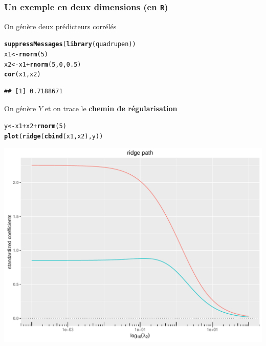 \documentclass{beamer}\usepackage[]{graphicx}\usepackage[]{color}
\makeatletter
\newcommand{\hlnum}[1]{\textcolor[rgb]{0.686,0.059,0.569}{#1}}%
\newcommand{\hlopt}[1]{\textcolor[rgb]{0,0,0}{#1}}%
\newcommand{\hlstd}[1]{\textcolor[rgb]{0.345,0.345,0.345}{#1}}%
\newcommand{\hlkwb}[1]{\textcolor[rgb]{0.69,0.353,0.396}{#1}}%
\newcommand{\hlkwd}[1]{\textcolor[rgb]{0.737,0.353,0.396}{\textbf{#1}}}%
\newenvironment{kframe}{%
 \def\at@end@of@kframe{}%
 \ifinner\ifhmode%
  \def\at@end@of@kframe{\end{minipage}}%
  \begin{minipage}{\columnwidth}%
 \fi\fi%
 \def\FrameCommand##1{\hskip\@totalleftmargin \hskip-\fboxsep
 \colorbox{shadecolor}{##1}\hskip-\fboxsep
     \hskip-\linewidth \hskip-\@totalleftmargin \hskip\columnwidth}%
 \MakeFramed {\advance\hsize-\width
   \@totalleftmargin\z@ \linewidth\hsize
   \@setminipage}}%
 {\par\unskip\endMakeFramed%
 \at@end@of@kframe}
\newenvironment{knitrout}{}{} %
\makeatother
\begin{document}
\begin{frame}
  \frametitle{Un exemple en deux dimensions (en \texttt{R})}

On génère deux prédicteurs corrélés
\begin{knitrout}\scriptsize
{}\color{fgcolor}\begin{kframe}
\begin{alltt}
\hlkwd{suppressMessages}\hlstd{(}\hlkwd{library}\hlstd{(quadrupen))}
\hlstd{x1} \hlkwb{<-} \hlkwd{rnorm}\hlstd{(}\hlnum{5}\hlstd{)}
\hlstd{x2} \hlkwb{<-} \hlstd{x1} \hlopt{+} \hlkwd{rnorm}\hlstd{(}\hlnum{5}\hlstd{,}\hlnum{0}\hlstd{,} \hlnum{0.5}\hlstd{)}
\hlkwd{cor}\hlstd{(x1,x2)}
\end{alltt}
\begin{verbatim}
## [1] 0.7188671
\end{verbatim}
\end{kframe}
\end{knitrout}

On génère $Y$ et on trace le \alert{\bf chemin de régularisation}
\begin{knitrout}\scriptsize
{}\color{fgcolor}\begin{kframe}
\begin{alltt}
\hlstd{y} \hlkwb{<-} \hlstd{x1} \hlopt{+} \hlstd{x2} \hlopt{+}\hlkwd{rnorm}\hlstd{(}\hlnum{5}\hlstd{)}
\hlkwd{plot}\hlstd{(}\hlkwd{ridge}\hlstd{(}\hlkwd{cbind}\hlstd{(x1,x2),y))}
\end{alltt}
\end{kframe}
\includegraphics[width=\textwidth]{figures/toy_ridgeunnamed-chunk-43-1} 


\end{knitrout}
\end{frame}
\end{document}
